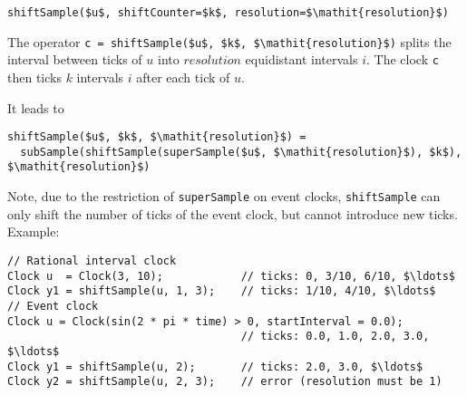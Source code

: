 \begin{operatordefinition}[shiftSample]
\begin{synopsis}\begin{lstlisting}
shiftSample($u$, shiftCounter=$k$, resolution=$\mathit{resolution}$)
\end{lstlisting}\end{synopsis}
\begin{semantics}
The operator \lstinline!c = shiftSample($u$, $k$, $\mathit{resolution}$)! splits the interval between ticks of $u$ into $\mathit{resolution}$ equidistant intervals $i$.  The clock \lstinline!c! then ticks $k$ intervals $i$ after each tick of $u$.

It leads to
\begin{lstlisting}[language=modelica]
shiftSample($u$, $k$, $\mathit{resolution}$) =
  subSample(shiftSample(superSample($u$, $\mathit{resolution}$), $k$), $\mathit{resolution}$)
\end{lstlisting}

\begin{nonnormative}
Note, due to the restriction of \lstinline!superSample! on event clocks, \lstinline!shiftSample! can only shift the number of ticks of the event clock, but cannot introduce new ticks.  Example:
\begin{lstlisting}[language=modelica]
// Rational interval clock
Clock u  = Clock(3, 10);            // ticks: 0, 3/10, 6/10, $\ldots$
Clock y1 = shiftSample(u, 1, 3);    // ticks: 1/10, 4/10, $\ldots$
// Event clock
Clock u = Clock(sin(2 * pi * time) > 0, startInterval = 0.0);
                                    // ticks: 0.0, 1.0, 2.0, 3.0, $\ldots$
Clock y1 = shiftSample(u, 2);       // ticks: 2.0, 3.0, $\ldots$
Clock y2 = shiftSample(u, 2, 3);    // error (resolution must be 1)
\end{lstlisting}
\end{nonnormative}
\end{semantics}
\end{operatordefinition}


